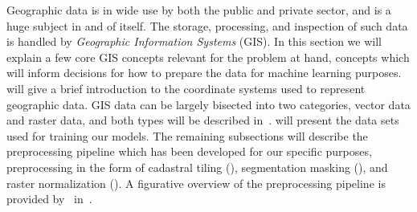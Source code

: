Geographic data is in wide use by both the public and private sector, and is a huge subject in and of itself.
The storage, processing, and inspection of such data is handled by \textit{Geographic Information Systems} (GIS).
In this section we will explain a few core GIS concepts relevant for the problem at hand, concepts which will inform decisions for how to prepare the data for machine learning purposes.
 will give a brief introduction to the coordinate systems used to represent geographic data.
GIS data can be largely bisected into two categories, vector data and raster data, and both types will be described in~.
 will present the data sets used for training our models.
The remaining subsections will describe the preprocessing pipeline which has been developed for our specific purposes, preprocessing in the form of cadastral tiling (), segmentation masking (), and raster normalization ().
A figurative overview of the preprocessing pipeline is provided by~ in~.
